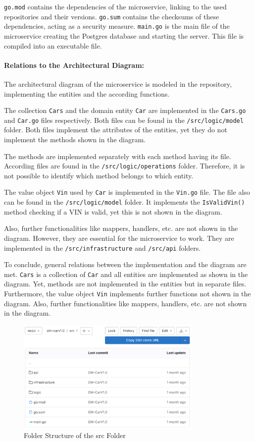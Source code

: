 \texttt{go.mod} contains the dependencies of the microservice, linking to the used repositories and their versions.
\texttt{go.sum} contains the checksums of these dependencies, acting as a security measure.
\texttt{main.go} is the main file of the microservice creating the Postgres database and starting the server.
This file is compiled into an executable file.

\paragraph*{Relations to the Architectural Diagram:}
The architectural diagram of the microservice is modeled in the repository, implementing the entities and the according functions.

The collection \texttt{Cars} and the domain entity \texttt{Car} are implemented in the \texttt{Cars.go} and \texttt{Car.go} files respectively.
Both files can be found in the \texttt{/src/logic/model} folder.
Both files implement the attributes of the entities, yet they do not implement the methods shown in the diagram.

The methods are implemented separately with each method having its file.
According files are found in the \texttt{/src/logic/operations} folder.
Therefore, it is not possible to identify which method belongs to which entity.

The value object \texttt{Vin} used by \texttt{Car} is implemented in the \texttt{Vin.go} file.
The file also can be found in the \texttt{/src/logic/model} folder.
It implements the \texttt{IsValidVin()} method checking if a VIN is valid, yet this is not shown in the diagram.

Also, further functionalities like mappers, handlers, etc. are not shown in the diagram.
However, they are essential for the microservice to work.
They are implemented in the \texttt{/src/infrastructure} and \texttt{/src/api} folders.

To conclude, general relations between the implementation and the diagram are met.
\texttt{Cars} is a collection of \texttt{Car} and all entities are implemented as shown in the diagram.
Yet, methods are not implemented in the entities but in separate files.
Furthermore, the value object \texttt{Vin} implements further functions not shown in the diagram.
Also, further functionalities like mappers, handlers, etc. are not shown in the diagram.

\begin{figure}
    \centering
    \includegraphics[width=0.8\textwidth]{figures/microservices/dmCar/ms_dmCar_srcFolderStructure.png}
    \caption{Folder Structure of the src Folder}
    \label{fig:ms_dmCar_srcFolderStructure}
\end{figure}
